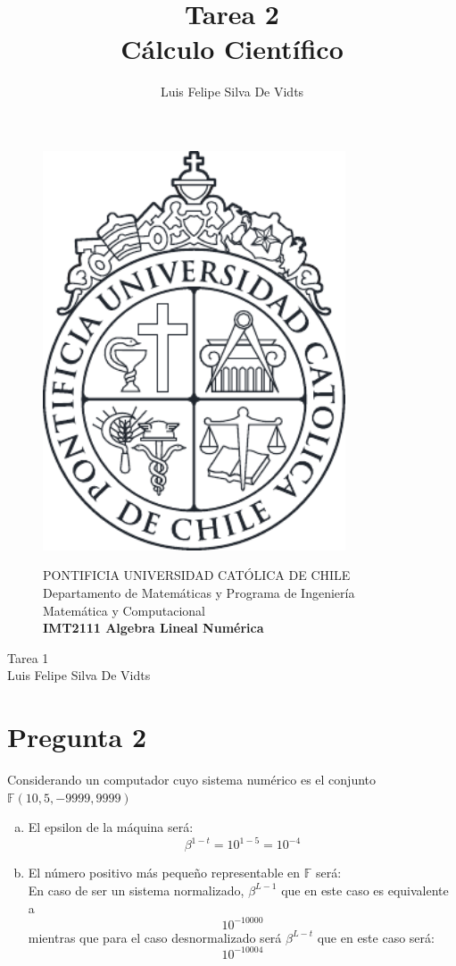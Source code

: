 \documentclass{article}
\title{Tarea 2\\Cálculo Científico}
\author{Luis Felipe Silva De Vidts}
\begin{document}
\begin{figure}
\begin{minipage}{2.5cm}
\includegraphics[width=0.8\textwidth]{./figures/LogoUC-BN}
\end{minipage}
\begin{minipage}{14.5cm}
\vspace{4mm}
{\sc PONTIFICIA UNIVERSIDAD CAT\'OLICA DE CHILE}\\
Departamento de Matemáticas y Programa de Ingeniería Matemática y Computacional \\
{\bf IMT2111 Algebra Lineal Numérica}\\
\vspace{0mm}
\hrulefill
\end{minipage}
\end{figure}
\phantom{""}
\vspace{-5mm}
\normalsize
\begin{center}
\Huge Tarea 1\\
\normalsize Luis Felipe Silva De Vidts
\end{center}
\section*{Pregunta 2}
Considerando un computador cuyo sistema numérico es el conjunto $\mathbb{F}(10,5,-9999,9999)$
\begin{enumerate}[a)]
\item El epsilon de la máquina será:\\
$$\beta^{1-t} = 10^{1-5} = 10^{-4} $$
\item El número positivo más pequeño representable en $\mathbb{F}$ será:\\
En caso de ser un sistema normalizado, $\beta^{L-1}$ que en este caso es equivalente a 
$$10^{-10000}$$
mientras que para el caso desnormalizado será $\beta^{L-t}$ que en este caso será:
$$10^{-10004}$$
\end{enumerate}
\end{document}
